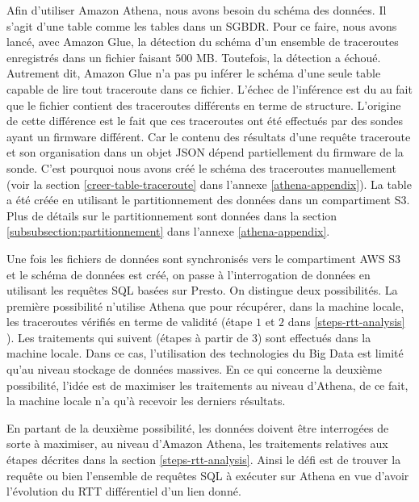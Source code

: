Afin d'utiliser Amazon Athena, nous avons besoin du schéma des données. Il s'agit d'une table comme les tables dans un SGBDR. Pour ce faire, 
nous avons lancé, avec Amazon Glue,  la détection du schéma d'un ensemble de  traceroutes enregistrés dans un fichier faisant $500$ MB. Toutefois, la détection a échoué. Autrement dit, Amazon Glue n'a pas pu inférer le schéma d'une seule table capable de lire tout traceroute dans ce fichier.  L'échec de l'inférence est du au fait que le fichier contient des traceroutes différents en terme de structure. L'origine de cette différence  est le fait que ces traceroutes ont été effectués par des sondes ayant un firmware différent. Car le contenu des résultats d'une requête traceroute  et son organisation dans un objet JSON dépend partiellement du firmware de la sonde. C'est pourquoi nous avons créé le schéma des traceroutes manuellement (voir la section \ref{creer-table-traceroute} dans l'annexe \ref{athena-appendix}). La table a été créée en utilisant le partitionnement des données dans un compartiment S3. Plus de détails sur le partitionnement sont données dans la section \ref{subsubsection:partitionnement} dans l'annexe \ref{athena-appendix}.


Une fois les fichiers de données sont synchronisés vers le compartiment AWS S3 et le schéma  de données est créé, on passe à l'interrogation de données en utilisant les requêtes SQL basées sur Presto.  On distingue deux possibilités. La première possibilité n'utilise Athena que pour récupérer, dans la machine locale,  les traceroutes vérifiés en terme de validité (étape $1$ et $2$ dans \ref{steps-rtt-analysis} ).  Les traitements qui suivent (étapes  à partir de $3$) sont effectués dans la machine locale. Dans ce cas, l'utilisation des technologies du Big Data est limité qu'au niveau stockage de données massives. En ce qui concerne la deuxième possibilité, l'idée est de maximiser les traitements au niveau d'Athena, de ce fait, la machine locale n'a qu'à recevoir les derniers résultats.




En partant de la deuxième possibilité, les données doivent être interrogées de sorte à maximiser,  	au niveau d'Amazon Athena,  les traitements relatives aux étapes décrites dans la section \ref{steps-rtt-analysis}. Ainsi le défi est de trouver la requête ou bien l'ensemble de requêtes SQL à exécuter sur Athena en vue d'avoir l'évolution du RTT différentiel d'un lien donné.

